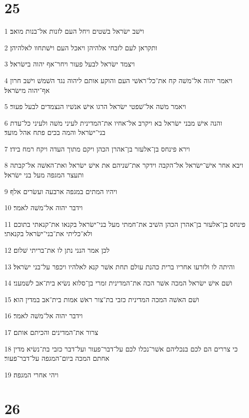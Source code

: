 \chapter{25}

\par 1 וישׁב ישׂראל בשׁטים ויחל העם לזנות אל־בנות מואב׃
\par 2 ותקראן לעם לזבחי אלהיהן ויאכל העם וישׁתחוו לאלהיהן׃
\par 3 ויצמד ישׂראל לבעל פעור ויחר־אף יהוה בישׂראל׃
\par 4 ויאמר יהוה אל־משׁה קח את־כל־ראשׁי העם והוקע אותם ליהוה נגד השׁמשׁ וישׁב חרון אף־יהוה מישׂראל׃
\par 5 ויאמר משׁה אל־שׁפטי ישׂראל הרגו אישׁ אנשׁיו הנצמדים לבעל פעור׃
\par 6 והנה אישׁ מבני ישׂראל בא ויקרב אל־אחיו את־המדינית לעיני משׁה ולעיני כל־עדת בני־ישׂראל והמה בכים פתח אהל מועד׃
\par 7 וירא פינחס בן־אלעזר בן־אהרן הכהן ויקם מתוך העדה ויקח רמח בידו׃
\par 8 ויבא אחר אישׁ־ישׂראל אל־הקבה וידקר את־שׁניהם את אישׁ ישׂראל ואת־האשׁה אל־קבתה ותעצר המגפה מעל בני ישׂראל׃
\par 9 ויהיו המתים במגפה ארבעה ועשׂרים אלף׃
\par 10 וידבר יהוה אל־משׁה לאמר׃
\par 11 פינחס בן־אלעזר בן־אהרן הכהן השׁיב את־חמתי מעל בני־ישׂראל בקנאו את־קנאתי בתוכם ולא־כליתי את־בני־ישׂראל בקנאתי׃
\par 12 לכן אמר הנני נתן לו את־בריתי שׁלום׃
\par 13 והיתה לו ולזרעו אחריו ברית כהנת עולם תחת אשׁר קנא לאלהיו ויכפר על־בני ישׂראל׃
\par 14 ושׁם אישׁ ישׂראל המכה אשׁר הכה את־המדינית זמרי בן־סלוא נשׂיא בית־אב לשׁמעני׃
\par 15 ושׁם האשׁה המכה המדינית כזבי בת־צור ראשׁ אמות בית־אב במדין הוא׃
\par 16 וידבר יהוה אל־משׁה לאמר׃
\par 17 צרור את־המדינים והכיתם אותם׃
\par 18 כי צררים הם לכם בנכליהם אשׁר־נכלו לכם על־דבר־פעור ועל־דבר כזבי בת־נשׂיא מדין אחתם המכה ביום־המגפה על־דבר־פעור׃
\par 19 ויהי אחרי המגפה׃

\chapter{26}

